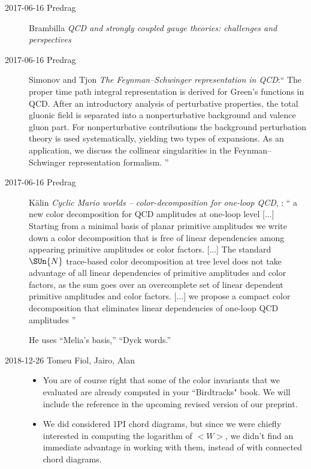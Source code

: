 \begin{description}
\item[2017-06-16 Predrag]
Brambilla \etal{}
{\em {QCD} and strongly coupled gauge theories: challenges and perspectives}

\item[2017-06-16 Predrag]
Simonov and Tjon
{\em The {Feynman–Schwinger} representation in {QCD}}:``
The proper time path integral representation is derived for Green's
functions in QCD. After an introductory analysis of perturbative
properties, the total gluonic field is separated into a nonperturbative
background and valence gluon part. For nonperturbative contributions the
background perturbation theory is used systematically, yielding two types
of expansions. As an application, we discuss the collinear singularities
in the Feynman–Schwinger representation formalism.
''

\item[2017-06-16 Predrag]
K{\"a}lin
{\em Cyclic {Mario} worlds -- color-decomposition for one-loop {QCD}},
: ``
a new color decomposition for QCD amplitudes at one-loop level [...] Starting
from a minimal basis of planar primitive amplitudes we write down a color
decomposition that is free of linear dependencies among appearing primitive
amplitudes or color factors. [...] The  standard  $\SUn{N}$ trace-based  color
decomposition at  tree  level  does  not take advantage of all linear
dependencies of primitive amplitudes and color factors, as the sum  goes  over
an  overcomplete  set  of  linear  dependent  primitive  amplitudes  and  color
factors. [...] we  propose  a  compact  color  decomposition that eliminates
linear dependencies of one-loop QCD amplitudes
''

He uses ``Melia's basis,'' ``Dyck words.''

\item[2018-12-26 Tomeu Fiol, Jairo, Alan] %
\begin{itemize}
  \item
You are of course right that some of the color invariants that we
evaluated are already computed in your ``Birdtracks" book. We will include
the reference in the upcoming revised version of our preprint.

  \item
We did considered 1PI chord diagrams, but since we were chiefly
interested in computing the logarithm of $<W>$, we didn't find an immediate
advantage in working with them, instead of with connected chord diagrams.


\end{itemize}
\end{description}
